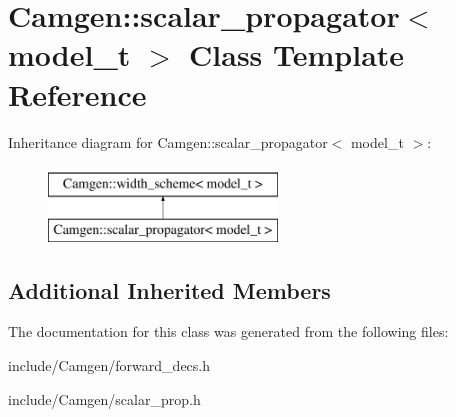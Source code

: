 \hypertarget{a00499}{}\section{Camgen\+:\+:scalar\+\_\+propagator$<$ model\+\_\+t $>$ Class Template Reference}
\label{a00499}
Inheritance diagram for Camgen\+:\+:scalar\+\_\+propagator$<$ model\+\_\+t $>$\+:\begin{figure}[H]
\begin{center}
\leavevmode
\includegraphics[height=2.000000cm]{a00499}
\end{center}
\end{figure}
\subsection*{Additional Inherited Members}


The documentation for this class was generated from the following files\+:\begin{DoxyCompactItemize}
\item 
include/\+Camgen/forward\+\_\+decs.\+h\item 
include/\+Camgen/scalar\+\_\+prop.\+h\end{DoxyCompactItemize}
